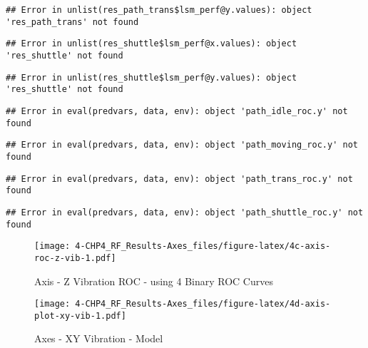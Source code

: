 \documentclass[]{article}
\begin{document}
\begin{verbatim}
## Error in unlist(res_path_trans$lsm_perf@y.values): object 'res_path_trans' not found
\end{verbatim}

\begin{verbatim}
## Error in unlist(res_shuttle$lsm_perf@x.values): object 'res_shuttle' not found
\end{verbatim}

\begin{verbatim}
## Error in unlist(res_shuttle$lsm_perf@y.values): object 'res_shuttle' not found
\end{verbatim}

\begin{verbatim}
## Error in eval(predvars, data, env): object 'path_idle_roc.y' not found
\end{verbatim}

\begin{verbatim}
## Error in eval(predvars, data, env): object 'path_moving_roc.y' not found
\end{verbatim}

\begin{verbatim}
## Error in eval(predvars, data, env): object 'path_trans_roc.y' not found
\end{verbatim}

\begin{verbatim}
## Error in eval(predvars, data, env): object 'path_shuttle_roc.y' not found
\end{verbatim}

\begin{figure}
\centering
\texttt{[image: 4-CHP4\_RF\_Results-Axes\_files/figure-latex/4c-axis-roc-z-vib-1.pdf]}
\caption{Axis - Z Vibration ROC - using 4 Binary ROC Curves}
\end{figure}

\begin{figure}
\centering
\texttt{[image: 4-CHP4\_RF\_Results-Axes\_files/figure-latex/4d-axis-plot-xy-vib-1.pdf]}
\caption{Axes - XY Vibration - Model}
\end{figure}
\end{document}
